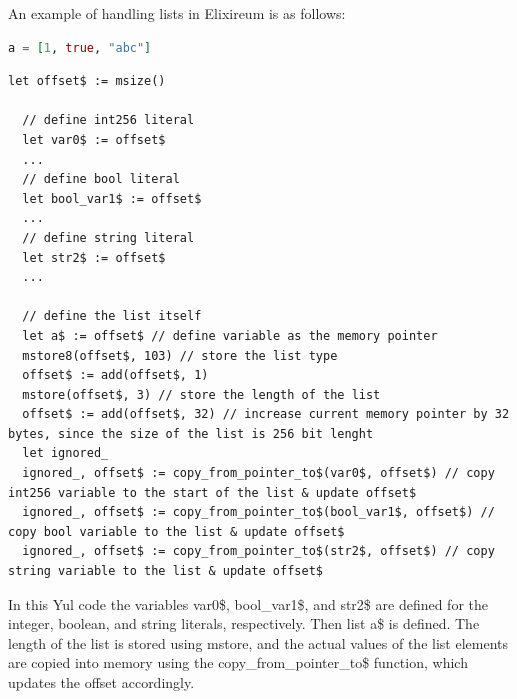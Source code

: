 An example of handling lists in Elixireum is as follows:

\begin{lstlisting}[caption={Elixireum code for list case}, language=elixir]
  a = [1, true, "abc"]
\end{lstlisting}
  
\begin{lstlisting}[caption={Generated yul code for string case}, language=yul]
  let offset$ := msize()
  
  // define int256 literal
  let var0$ := offset$
  ...  
  // define bool literal
  let bool_var1$ := offset$
  ...
  // define string literal
  let str2$ := offset$
  ...
  
  // define the list itself
  let a$ := offset$ // define variable as the memory pointer
  mstore8(offset$, 103) // store the list type
  offset$ := add(offset$, 1)
  mstore(offset$, 3) // store the length of the list 
  offset$ := add(offset$, 32) // increase current memory pointer by 32 bytes, since the size of the list is 256 bit lenght
  let ignored_
  ignored_, offset$ := copy_from_pointer_to$(var0$, offset$) // copy int256 variable to the start of the list & update offset$
  ignored_, offset$ := copy_from_pointer_to$(bool_var1$, offset$) // copy bool variable to the list & update offset$
  ignored_, offset$ := copy_from_pointer_to$(str2$, offset$) // copy string variable to the list & update offset$
\end{lstlisting}

In this Yul code the variables var0\$, bool\_var1\$, and str2\$ are defined for the integer, boolean, and string literals, respectively. Then list a\$ is defined. The length of the list is stored using mstore, and the actual values of the list elements are copied into memory using the copy\_from\_pointer\_to\$ function, which updates the offset accordingly.

